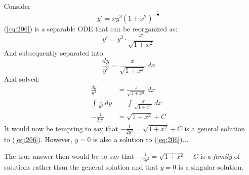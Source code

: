 \documentclass[12pt]{article}
\begin{document}
Consider
\begin{equation}
  y' = xy^3\left(1+x^2\right)^{-\frac{1}{2}}
  \label{eq:206}
\end{equation}
(\ref{eq:206}) is a separable ODE that can be reorganized as:
\begin{equation*}
  y' = y^3 \cdot \frac{x}{\sqrt{1+x^2}}
\end{equation*}
And subsequently separated into:
\begin{equation*}
  \frac{dy}{y^3} = \frac{x}{\sqrt{1+x^2}}\ dx
\end{equation*}
And solved:
\begin{align*}
  \frac{dy}{y^3} &= \frac{x}{\sqrt{1+x^2}}\ dx \\
  \int_{}^{} \frac{1}{y^3} \, dy &= \int_{}^{} \frac{x}{\sqrt{1+x^2}}\,dx \\
  -\frac{1}{2y^2} &= \sqrt{1+x^2} + C
\end{align*}
It would now be tempting to say that $-\frac{1}{2y^2} = \sqrt{1+x^2} + C$ is a general solution to (\ref{eq:206}). However, $y=0$ is also a solution to (\ref{eq:206})$\hdots$

The true answer then would be to say that $-\frac{1}{2y^2} = \sqrt{1+x^2} + C$ is a \textit{family} of solutions rather than the general solution and that $y=0$ is a singular solution.
\end{document}
